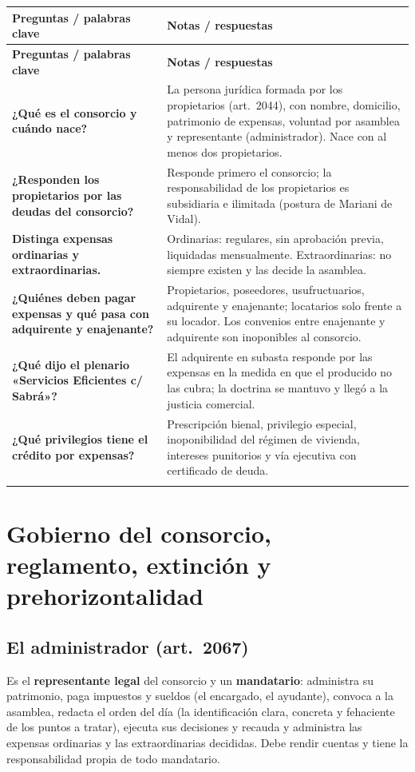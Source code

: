 \documentclass[12pt,oneside]{book}
\makeatletter
\renewcommand{\arraystretch}{1.25}
\newcommand{\cq}[2]{\textbf{#1} & #2 \\[0.45em]}
\newcommand{\cornell}[3]{%
\par\bigskip\noindent{\large\bfseries Cuadro Cornell: #1}\par\nopagebreak\smallskip
\begingroup
\small
\renewcommand{\arraystretch}{1.15}
\begin{longtable}{@{}>{\raggedright\arraybackslash}p{0.26\textwidth}>{\raggedright\arraybackslash}p{0.66\textwidth}@{}}
\toprule
\textbf{Preguntas / palabras clave} & \textbf{Notas / respuestas} \\
\midrule
\endfirsthead
\toprule
\textbf{Preguntas / palabras clave} & \textbf{Notas / respuestas} \\
\midrule
\endhead
#2
\midrule
\multicolumn{2}{@{}p{\dimexpr0.92\textwidth+2\tabcolsep\relax}@{}}{\vspace{0.2em}\textbf{Resumen.} #3\vspace{0.2em}} \\
\bottomrule
\end{longtable}
\endgroup
}
\makeatother
\begin{document}
\cornell{consorcio y expensas}{
\cq{¿Qué es el consorcio y cuándo nace?}{La persona jurídica formada por los propietarios (art.~2044), con nombre, domicilio, patrimonio de expensas, voluntad por asamblea y representante (administrador). Nace con al menos dos propietarios.}
\cq{¿Responden los propietarios por las deudas del consorcio?}{Responde primero el consorcio; la responsabilidad de los propietarios es subsidiaria e ilimitada (postura de Mariani de Vidal).}
\cq{Distinga expensas ordinarias y extraordinarias.}{Ordinarias: regulares, sin aprobación previa, liquidadas mensualmente. Extraordinarias: no siempre existen y las decide la asamblea.}
\cq{¿Quiénes deben pagar expensas y qué pasa con adquirente y enajenante?}{Propietarios, poseedores, usufructuarios, adquirente y enajenante; locatarios solo frente a su locador. Los convenios entre enajenante y adquirente son inoponibles al consorcio.}
\cq{¿Qué dijo el plenario «Servicios Eficientes c/ Sabrá»?}{El adquirente en subasta responde por las expensas en la medida en que el producido no las cubra; la doctrina se mantuvo y llegó a la justicia comercial.}
\cq{¿Qué privilegios tiene el crédito por expensas?}{Prescripción bienal, privilegio especial, inoponibilidad del régimen de vivienda, intereses punitorios y vía ejecutiva con certificado de deuda.}
}{El consorcio es una persona jurídica sostenida por las expensas, cuya obligación recae sobre propietarios, poseedores y aun sobre quien ya enajenó. La expensa es una obligación \textit{propter rem sui generis} muy tutelada, y la doctrina del plenario protege el cobro frente a la subasta.}

\chapter[Gobierno del consorcio, reglamento, extinción y prehorizontalidad]{Gobierno del consorcio, reglamento, extinción y prehorizontalidad}\label{cap:gobierno-ph}

\section{El administrador (art.~2067)}

Es el \textbf{representante legal} del consorcio y un \textbf{mandatario}: administra su patrimonio, paga impuestos y sueldos (el encargado, el ayudante), convoca a la asamblea, redacta el orden del día (la identificación clara, concreta y fehaciente de los puntos a tratar), ejecuta sus decisiones y recauda y administra las expensas ordinarias y las extraordinarias decididas. Debe rendir cuentas y tiene la responsabilidad propia de todo mandatario.
\end{document}
